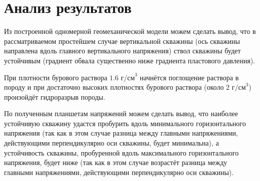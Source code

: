 \chapter{Анализ результатов} \label{ch3}

Из построенной одномерной геомеханической модели можем сделать вывод, что в рассматриваемом простейшем случае вертикальной скважины (ось скважины направлена вдоль главного вертикального напряжения) ствол скважины будет устойчивым (градиент обвала существенно ниже градиента пластового давления).

При плотности бурового раствора $1.6\text{ г/см}^3$ начнётся поглощение раствора в породу и при достаточно высоких плотностях бурового раствора (около $2\text{ г/см}^3$) произойдёт гидроразрыв породы.

По полученным планшетам напряжений можем сделать вывод, что наиболее устойчивую скважину удастся пробурить вдоль минимального горизонтального напряжения (так как в этом случае разница между главными напряжениями, действующими перпендикулярно оси скважины, будет минимальна), а устойчивость скважины, пробуренной вдоль максимального горизонтального напряжения, будет ниже (так как в этом случае возрастёт разница между главными напряжениями, действующими перпендикулярно оси скважины).
